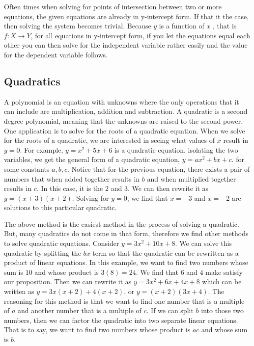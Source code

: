 \documentclass[12pt]{report}
\begin{document}
Often times when solving for points of intersection between two or more equations, the given equations are already in y-intercept form. If that it the case, then solving the system becomes trivial. Because $y$ is a function of $x$ , that is $f: X \rightarrow Y$, for all equations in y-intercept form, if you let the equations equal each other you can then solve for the independent variable rather easily and the value for the dependent variable follows.

\subsection{Quadratics}

\hspace{\parindent}A polynomial is an equation with unknowns where the only operations that it can include are multiplication, addition and subtraction.
A quadratic is a second degree polynomial, meaning  that the unknowns are raised to the second power. One application is to solve for the roots of a quadratic equation. When we solve for the roots of a quadratic, we are interested in seeing what values of $x$ result in $y=0$. For example, $y=x^2+5x+6$ is a quadratic equation.
isolating the two variables, we get the general form of a quadratic equation, $y=ax^2+bx+c$. for some constants $a, b, c$. Notice that for the previous equation, there exists a pair of numbers that when added together results in $b$ and when multiplied together results in $c$. In this case, it is the $2$ and $3$. We can then rewrite it as $y=(x+3)(x+2)$. Solving for $y=0$, we find that $x=-3$ and $x=-2$ are solutions to this particular quadratic.


The above method is the easiest method in the process of solving a quadratic. But, many quadratics do not come in that form, therefore we find other methods to solve quadratic equations. Consider $y=3x^2+10x+8$. We can solve this quadratic by splitting the $bx$ term so that the quadratic can be rewritten as a product of linear equations. In this example, we want to find two numbers whose sum is $10$ and whose product is $3(8)=24$. We find that $6$ and $4$ make satisfy our proposition. Then we can rewrite it as $y=3x^2+6x+4x+8$ which can be written as $y=3x(x+2)+4(x+2)$, or $y=(x+2)(3x+4)$. The reasoning for this method is that we want to find one number that is a multiple of $a$ and another number that is a multiple of $c$. If we can split $b$ into those two numbers, then we can factor the quadratic into two separate linear equations. That is to say, we want to find two numbers whose product is $ac$ and whose sum is $b$.
\end{document}
